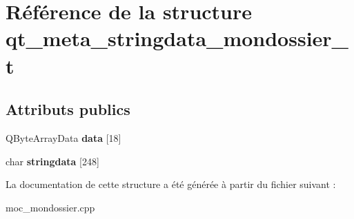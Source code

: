 \hypertarget{structqt__meta__stringdata__mondossier__t}{\section{Référence de la structure qt\+\_\+meta\+\_\+stringdata\+\_\+mondossier\+\_\+t}
\label{structqt__meta__stringdata__mondossier__t}
}
\subsection*{Attributs publics}
\begin{DoxyCompactItemize}
\item 
\hypertarget{structqt__meta__stringdata__mondossier__t_ae7b9b24585d7c4b5197d5e0c07fabbda}{Q\+Byte\+Array\+Data {\bfseries data} \mbox{[}18\mbox{]}}\label{structqt__meta__stringdata__mondossier__t_ae7b9b24585d7c4b5197d5e0c07fabbda}

\item 
\hypertarget{structqt__meta__stringdata__mondossier__t_abd12e01fccd077176382c081677ff94e}{char {\bfseries stringdata} \mbox{[}248\mbox{]}}\label{structqt__meta__stringdata__mondossier__t_abd12e01fccd077176382c081677ff94e}

\end{DoxyCompactItemize}


La documentation de cette structure a été générée à partir du fichier suivant \+:\begin{DoxyCompactItemize}
\item 
moc\+\_\+mondossier.\+cpp\end{DoxyCompactItemize}
